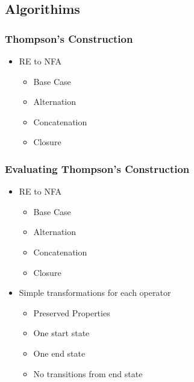 \documentclass[usepdftitle=false,professionalfonts,compress ]{beamer}
\begin{document}
\subsection{Algorithims}

{
\begin{frame}\frametitle{Thompson's Construction}

	\begin{itemize}
	\item RE to NFA

	\begin{itemize}
	\item Base Case
			\item Alternation
			\item Concatenation
			\item Closure
				\end{itemize}

				\end{itemize}

\end{frame}}



{
\begin{frame}\frametitle{Evaluating Thompson's Construction}

	\begin{itemize}
	\item RE to NFA

	\begin{itemize}
	\item Base Case
			\item Alternation
			\item Concatenation
			\item Closure
				\end{itemize}

			\item Simple transformations for each operator

	\begin{itemize}
	\item Preserved Properties
			\item One start state
			\item One end state
			\item No transitions from end state
				\end{itemize}

				\end{itemize}

\end{frame}}
\end{document}
